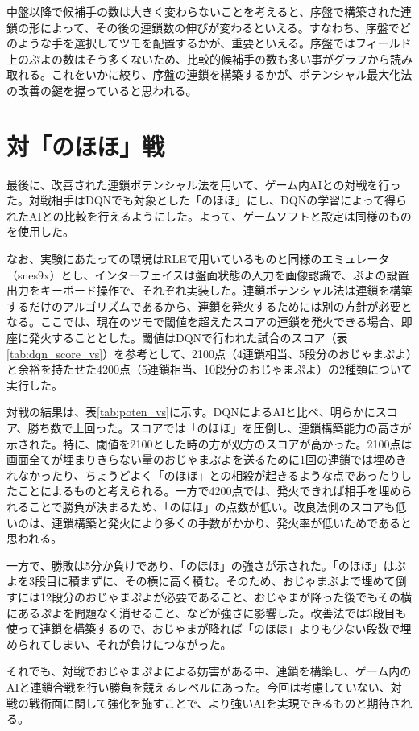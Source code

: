 \documentclass[12pt]{jreport}
\begin{document}
中盤以降で候補手の数は大きく変わらないことを考えると、序盤で構築された連鎖の形によって、その後の連鎖数の伸びが変わるといえる。すなわち、序盤でどのような手を選択してツモを配置するかが、重要といえる。序盤ではフィールド上のぷよの数はそう多くないため、比較的候補手の数も多い事がグラフから読み取れる。これをいかに絞り、序盤の連鎖を構築するかが、ポテンシャル最大化法の改善の鍵を握っていると思われる。


\section{対「のほほ」戦}
最後に、改善された連鎖ポテンシャル法を用いて、ゲーム内AIとの対戦を行った。対戦相手はDQNでも対象とした「のほほ」にし、DQNの学習によって得られたAIとの比較を行えるようにした。よって、ゲームソフトと設定は同様のものを使用した。

なお、実験にあたっての環境はRLEで用いているものと同様のエミュレータ（snes9x）とし、インターフェイスは盤面状態の入力を画像認識で、ぷよの設置出力をキーボード操作で、それぞれ実装した。連鎖ポテンシャル法は連鎖を構築するだけのアルゴリズムであるから、連鎖を発火するためには別の方針が必要となる。ここでは、現在のツモで閾値を超えたスコアの連鎖を発火できる場合、即座に発火することとした。閾値はDQNで行われた試合のスコア（表\ref{tab:dqn_score_vs}）を参考として、2100点（4連鎖相当、5段分のおじゃまぷよ）と余裕を持たせた4200点（5連鎖相当、10段分のおじゃまぷよ）の2種類について実行した。

対戦の結果は、表\ref{tab:poten_vs}に示す。DQNによるAIと比べ、明らかにスコア、勝ち数で上回った。スコアでは「のほほ」を圧倒し、連鎖構築能力の高さが示された。特に、閾値を2100とした時の方が双方のスコアが高かった。2100点は画面全てが埋まりきらない量のおじゃまぷよを送るために1回の連鎖では埋めきれなかったり、ちょうどよく「のほほ」との相殺が起きるような点であったりしたことによるものと考えられる。一方で4200点では、発火できれば相手を埋められることで勝負が決まるため、「のほほ」の点数が低い。改良法側のスコアも低いのは、連鎖構築と発火により多くの手数がかかり、発火率が低いためであると思われる。

一方で、勝敗は5分か負けであり、「のほほ」の強さが示された。「のほほ」はぷよを3段目に積まずに、その横に高く積む。そのため、おじゃまぷよで埋めて倒すには12段分のおじゃまぷよが必要であること、おじゃまが降った後でもその横にあるぷよを問題なく消せること、などが強さに影響した。改善法では3段目も使って連鎖を構築するので、おじゃまが降れば「のほほ」よりも少ない段数で埋められてしまい、それが負けにつながった。

それでも、対戦でおじゃまぷよによる妨害がある中、連鎖を構築し、ゲーム内のAIと連鎖合戦を行い勝負を競えるレベルにあった。今回は考慮していない、対戦の戦術面に関して強化を施すことで、より強いAIを実現できるものと期待される。
\end{document}
